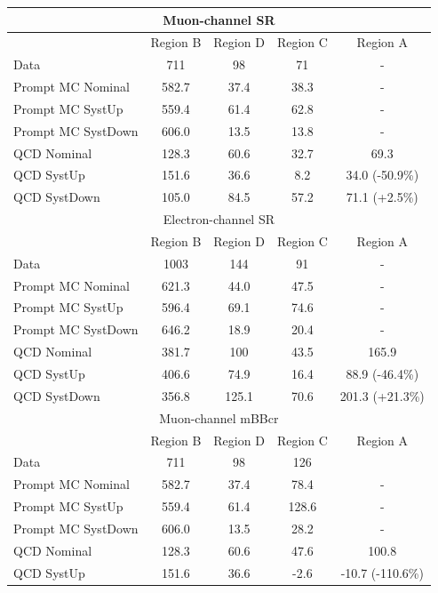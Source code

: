 \begin{table}[!htbp]
\begin{footnotesize}
\begin{center}
\begin{tabular}{l|c|c|c|c}
\hline
\hline
\hline
\multicolumn{5}{c}{Muon-channel SR} \\
\hline
& Region B & Region D & Region C & Region A \\
\hline
Data & 711 & 98 & 71 & - \\
\hline
Prompt MC Nominal  & 582.7 & 37.4 & 38.3 & - \\
Prompt MC SystUp   & 559.4 & 61.4 & 62.8 & - \\
Prompt MC SystDown & 606.0 & 13.5 & 13.8 & - \\
\hline
QCD Nominal  & 128.3 & 60.6 & 32.7 & 69.3 \\
QCD SystUp   & 151.6 & 36.6 & 8.2  & 34.0 (-50.9\%) \\
QCD SystDown & 105.0 & 84.5 & 57.2 & 71.1 (+2.5\%) \\
\hline
\hline
\hline
\multicolumn{5}{c}{Electron-channel SR} \\
\hline
& Region B & Region D & Region C & Region A \\
\hline
Data & 1003 & 144 & 91 & - \\
\hline
Prompt MC Nominal  & 621.3 & 44.0 & 47.5   & - \\
Prompt MC SystUp   & 596.4 & 69.1 & 74.6 & - \\
Prompt MC SystDown & 646.2 & 18.9 & 20.4 & - \\
\hline
QCD Nominal  & 381.7 & 100 & 43.5 & 165.9 \\
QCD SystUp   & 406.6 & 74.9 & 16.4 & 88.9 (-46.4\%) \\
QCD SystDown & 356.8 & 125.1 & 70.6 & 201.3 (+21.3\%) \\
\hline
\hline
\hline
\multicolumn{5}{c}{Muon-channel mBBcr} \\
\hline
& Region B & Region D & Region C & Region A \\
\hline
Data & 711 & 98 & 126 &  \\
\hline
Prompt MC Nominal  & 582.7 & 37.4 & 78.4  & -  \\
Prompt MC SystUp   & 559.4 & 61.4 & 128.6 & - \\
Prompt MC SystDown & 606.0 & 13.5 & 28.2  & - \\
\hline
QCD Nominal  & 128.3 & 60.6 & 47.6 & 100.8 \\
QCD SystUp   & 151.6 & 36.6 & -2.6 & -10.7 (-110.6\%) \\

\end{tabular}
\end{center}
\end{footnotesize}
\end{table}
